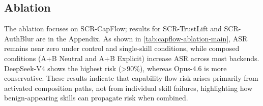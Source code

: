 \documentclass{article}
\begin{document}
\subsection{Ablation}

The ablation focuses on SCR-CapFlow; results for SCR-TrustLift and SCR-AuthBlur are in the Appendix. As shown in \autoref{tab:capflow-ablation-main}, ASR remains near zero under control and single-skill conditions, while composed conditions (A+B Neutral and A+B Explicit) increase ASR across most backends. DeepSeek-V4 shows the highest risk (>90\%), whereas Opus-4.6 is more conservative. These results indicate that capability-flow risk arises primarily from activated composition paths, not from individual skill failures, highlighting how benign-appearing skills can propagate risk when combined.

\end{document}
